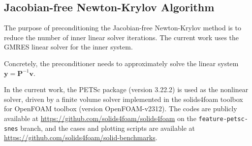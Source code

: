 \documentclass[sn-mathphys,Numbered]{sn-jnl}%
\newcommand{\bb}{\boldsymbol}
\begin{document}
\subsection{Jacobian-free Newton-Krylov Algorithm}
\label{sec:JFNK_alg}


The purpose of preconditioning the Jacobian-free Newton-Krylov method is to reduce the number of inner linear solver iterations.
The current work uses the GMRES linear solver for the inner system.

Concretely, the preconditioner needs to approximately solve the linear system $\bb{y} = \bb{P}^{-1} \bb{v}$.


In the current work, the PETSc package (version 3.22.2) \cite{PETSc} is used as the nonlinear solver, driven by a finite volume solver implemented in the solids4foam toolbox \citep{Cardiff2018, Tukovic2018} for OpenFOAM toolbox \citep{Weller1998} (version OpenFOAM-v2312).
The codes are publicly available at \url{https://github.com/solids4foam/solids4foam} on the \texttt{feature-petsc-snes} branch, and the cases and plotting scripts are available at \url{https://github.com/solids4foam/solid-benchmarks}.
\end{document}
